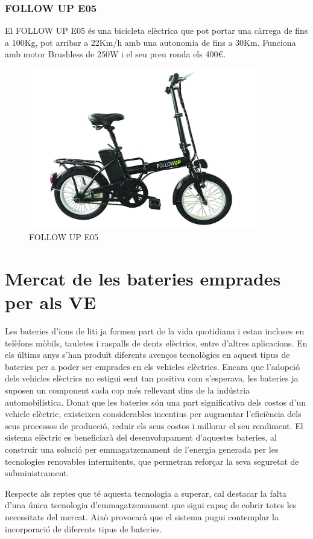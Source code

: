 \subsubsection{FOLLOW UP E05 }
El FOLLOW UP E05 és una bicicleta elèctrica que pot portar una càrrega de fins a 100Kg, pot arribar a 22Km/h amb una autonomia de fins a 30Km. Funciona amb motor Brushless de 250W i el seu preu ronda els 400€.
\begin{figure}[H]
		\centering
    	\includegraphics[width=10cm, height=7cm]{Marcteoric/followupe05.jpg}
     	\caption{FOLLOW UP E05}
\end{figure}

\section {Mercat de les bateries emprades per als VE}
Les bateries d'ions de liti ja formen part de la vida quotidiana i estan incloses en telèfons mòbils, tauletes i raspalls de dents elèctrics, entre d'altres aplicacions. En els últims anys s'han produït diferents avenços tecnològics en aquest tipus de bateries per a poder ser emprades en els vehicles elèctrics. Encara que l'adopció dels vehicles elèctrics no estigui sent tan positiva com s'esperava, les bateries ja suposen un component cada cop més rellevant dins de la indústria automobilística. Donat que les bateries són una part significativa dels costos d'un vehicle elèctric, existeixen considerables incentius per augmentar l'eficiència dels seus processos de producció, reduir els seus costos i millorar el seu rendiment. El sistema elèctric es beneficiarà del desenvolupament d'aquestes bateries, al construir una solució per emmagatzemament de l'energia generada per les tecnologies renovables intermitents, que permetran reforçar la seva seguretat de subministrament.

Respecte als reptes que té aquesta tecnologia a superar, cal destacar la falta d'una única tecnologia d'emmagatzemament que sigui capaç de cobrir totes les necessitats del mercat. Això provocarà que el sistema pugui contemplar la incorporació de diferents tipus de bateries. 

